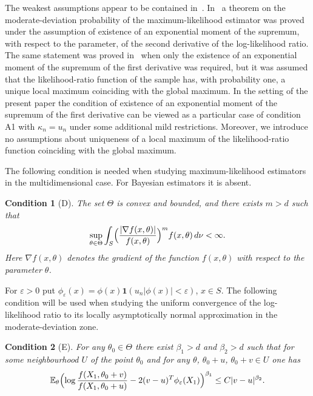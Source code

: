 \documentclass[11pt,a4paper]{article}
\newtheorem{condition}{Condition}
\begin{document}
The weakest assumptions appear to be contained in~\cite{1}. In~\cite{1} a theorem on the moderate-deviation probability of the maximum-likelihood estimator was proved under the assumption of existence of an exponential moment of the supremum, with respect to the parameter, of the second derivative of the log-likelihood ratio. The same statement was proved in~\cite{1} when only the existence of an exponential moment of the supremum of the first derivative was required, but it was assumed that the likelihood-ratio function of the sample has, with probability one, a unique local maximum coinciding with the global maximum. In the setting of the present paper the condition of existence of an exponential moment of the supremum of the first derivative can be viewed as a particular case of condition A1 with $\kappa_n=u_n$ under some additional mild restrictions. Moreover, we introduce no assumptions about uniqueness of a local maximum of the likelihood-ratio function coinciding with the global maximum.

The following condition is needed when studying maximum-likelihood estimators in the multidimensional case. For Bayesian estimators it is absent.

\begin{condition}[D]
The set $\Theta$ is convex and bounded, and there exists $m>d$ such that
\begin{equation}
\sup_{\theta\in\Theta}\int_S\Bigl(\frac{|\nabla f(x,\theta)|}{f(x,\theta)}\Bigr)^m f(x,\theta)\,d\nu<\infty.
\label{eq:D}
\end{equation}
Here $\nabla f(x,\theta)$ denotes the gradient of the function $f(x,\theta)$ with respect to the parameter $\theta$.
\end{condition}

For $\varepsilon>0$ put $\phi_\varepsilon(x)=\phi(x)\mathbf{1}(u_n|\phi(x)|<\varepsilon)$, $x\in S$.
The following condition will be used when studying the uniform convergence of the log-likelihood ratio to its locally asymptotically normal approximation in the moderate-deviation zone.

\begin{condition}[E]
For any $\theta_0\in\Theta$ there exist $\beta_1>d$ and $\beta_2>d$ such that for some neighbourhood $U$ of the point $\theta_0$ and for any $\theta$, $\theta_0+u$, $\theta_0+v\in U$ one has
\begin{equation}
\mathbb{E}_\theta\Bigl(\log\frac{f(X_1,\theta_0+v)}{f(X_1,\theta_0+u)}-2(v-u)^T\phi_\varepsilon(X_1)\Bigr)^{\beta_1}\le C|v-u|^{\beta_2}.
\label{eq:E}
\end{equation}
\end{condition}
\end{document}
